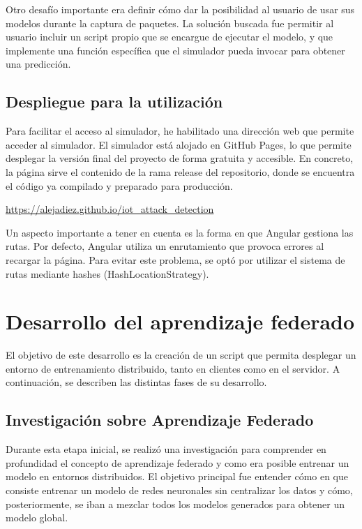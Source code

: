 Otro desafío importante era definir cómo dar la posibilidad al usuario de usar sus modelos durante la captura de paquetes. La solución buscada fue permitir al usuario incluir un script propio que se encargue de ejecutar el modelo, y que implemente una función específica que el simulador pueda invocar para obtener una predicción.

\subsection{Despliegue para la utilización}
\label{subsec:Despliegue}
Para facilitar el acceso al simulador, he habilitado una dirección web que permite acceder al simulador. El simulador está alojado en GitHub Pages, lo que permite desplegar la versión final del proyecto de forma gratuita y accesible. En concreto, la página sirve el contenido de la rama release del repositorio, donde se encuentra el código ya compilado y preparado para producción.

\url{https://alejadiez.github.io/iot_attack_detection}

Un aspecto importante a tener en cuenta es la forma en que Angular gestiona las rutas. Por defecto, Angular utiliza un enrutamiento que provoca errores al recargar la página. Para evitar este problema, se optó por utilizar el sistema de rutas mediante hashes (HashLocationStrategy).

\section{Desarrollo del aprendizaje federado}
\label{sec:DesarrolloAprendizajeFederado}
El objetivo de este desarrollo es la creación de un script que permita desplegar un entorno de entrenamiento distribuido, tanto en clientes como en el servidor. A continuación, se describen las distintas fases de su desarrollo.

\subsection{Investigación sobre Aprendizaje Federado}
\label{subsec:InvestigacionAprendizajeFederado}
Durante esta etapa inicial, se realizó una investigación para comprender en profundidad el concepto de aprendizaje federado y como era posible entrenar un modelo en entornos distribuidos. El objetivo principal fue entender cómo en que consiste entrenar un modelo de redes neuronales sin centralizar los datos y cómo, posteriormente, se iban a mezclar todos los modelos generados para obtener un modelo global.

